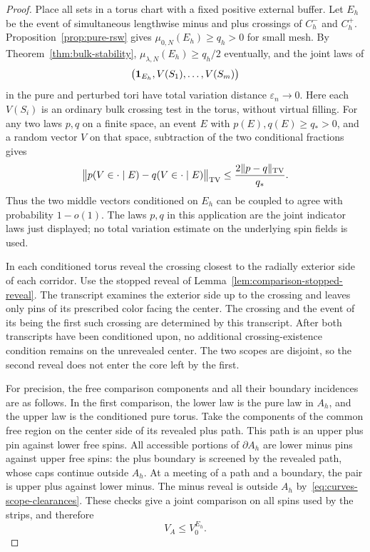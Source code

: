 \begin{proof}
Place all sets in a torus chart with a fixed positive external buffer.
Let $E_h$ be the event of simultaneous lengthwise minus and plus
crossings of $C_h^-$ and $C_h^+$.  Proposition~\ref{prop:pure-rsw} gives
$\mu_{0,N}(E_h)\geq q_h>0$ for small mesh.  By
Theorem~\ref{thm:bulk-stability}, $\mu_{\lambda,N}(E_h)\geq q_h/2$
eventually, and the joint laws of
\[
 \bigl(\mathbf 1_{E_h},V(S_1),\ldots,V(S_m)\bigr)
\]
in the pure and perturbed tori have total variation distance
$\varepsilon_n\to0$.  Here each $V(S_i)$ is an ordinary bulk crossing
test in the torus, without virtual filling.  For any two laws $p,q$ on
a finite space, an event $E$ with $p(E),q(E)\geq q_*>0$, and a random
vector $V$ on that space, subtraction of the two conditional fractions
gives
\begin{equation}
 \bigl\|p(V\in\cdot\mid E)-q(V\in\cdot\mid E)\bigr\|_{\operatorname{TV}}
 \leq \frac{2\|p-q\|_{\operatorname{TV}}}{q_*}.
 \label{eq:curves-conditioned-tv}
\end{equation}
Thus the two middle vectors conditioned on $E_h$ can be coupled to agree
with probability $1-o(1)$.  The laws $p,q$ in this application are the
joint indicator laws just displayed; no total variation estimate on the
underlying spin fields is used.

In each conditioned torus reveal the crossing closest to the radially
exterior side of each corridor.  Use the stopped reveal of
Lemma~\ref{lem:comparison-stopped-reveal}.  The transcript examines the
exterior side up to the crossing and leaves only pins of its prescribed
color facing the center.  The crossing and the event of its being the
first such crossing are determined by this transcript.  After both
transcripts have been conditioned upon, no additional crossing-existence
condition remains on the unrevealed center.  The two scopes are disjoint,
so the second reveal does not enter the core left by the first.

For precision, the free comparison components and all their boundary
incidences are as follows.  In the first comparison, the lower law is the
pure law in $A_h$, and the upper law is the conditioned pure torus.  Take
the components of the common free region on the center side of its
revealed plus path.  This path is an upper plus pin against lower free
spins.  All accessible portions of $\partial A_h$ are lower minus pins
against upper free spins: the plus boundary is screened by the revealed
path, whose caps continue outside $A_h$.  At a meeting of a path and a
boundary, the pair is upper plus against lower minus.  The minus reveal
is outside $A_h$ by~\eqref{eq:curves-scope-clearances}.  These checks give
a joint comparison on all spins used by the strips, and therefore
\[
 V_A\leq V_0^{E_h}.
\]


\end{proof}
